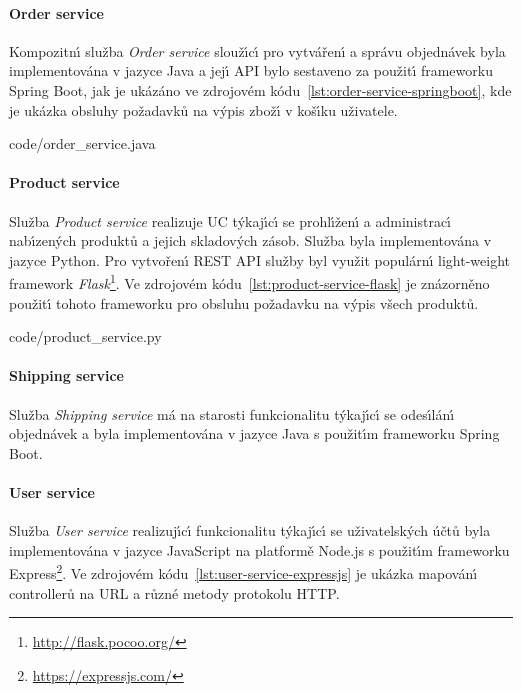 \paragraph{Order service}

Kompozitn\'{\i} služba \textit{Order service} slouž\'{\i}c\'{\i} pro vytvářen\'{\i} a správu objednávek
byla implementována v jazyce Java a jej\'{\i} \gls{API} bylo sestaveno za použit\'{\i} frameworku Spring
Boot, jak je ukázáno ve zdrojovém kódu~\ref{lst:order-service-springboot}, kde
je ukázka obsluhy požadavků na v\'ypis zbož\'{\i} v koš\'{\i}ku uživatele.


{code/order_service.java}

\paragraph{Product service}

Služba \textit{Product service} realizuje \gls{UC} t\'ykaj\'{\i}c\'{\i} se
prohl\'{\i}žen\'{\i} a administrac\'{\i} nab\'{\i}zen\'ych
produktů a jejich skladov\'ych zásob. Služba byla implementována v jazyce Python.
Pro vytvořen\'{\i} \gls{REST} \gls{API} služby byl využit populárn\'{\i}
light-weight framework \textit{Flask}\footnote{\url{http://flask.pocoo.org/}}.
Ve zdrojovém kódu~\ref{lst:product-service-flask} je znázorněno použit\'{\i}
tohoto frameworku pro obsluhu požadavku na v\'ypis všech produktů.


{code/product_service.py}

\paragraph{Shipping service}

Služba \textit{Shipping service} má na starosti funkcionalitu t\'ykaj\'{\i}c\'{\i} se odes\'{\i}lán\'{\i} objednávek
a byla implementována v jazyce Java s použit\'{\i}m frameworku Spring Boot.

\paragraph{User service}

Služba \textit{User service} realizuj\'{\i}c\'{\i} funkcionalitu t\'ykaj\'{\i}c\'{\i} se uživatelsk\'ych účtů byla
implementována v jazyce JavaScript na platformě Node.js s použit\'{\i}m
frameworku Express\footnote{\url{https://expressjs.com/}}. Ve zdrojovém kódu~\ref{lst:user-service-expressjs}
je ukázka mapován\'{\i} controllerů na \gls{URL}  a různé metody protokolu \gls{HTTP}.

